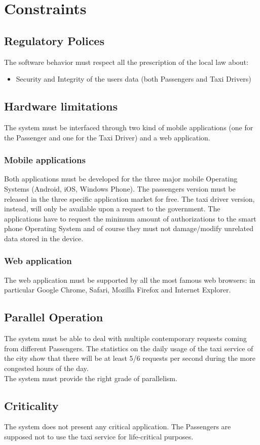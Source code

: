 \section{Constraints}
\subsection{Regulatory Polices}
The software behavior must respect all the prescription of the local law about:
\begin{itemize}
\item Security and Integrity of the users data (both Passengers and Taxi Drivers)
\end{itemize}
\subsection{Hardware limitations}
The system must be interfaced through two kind of mobile applications (one for the Passenger and one for the Taxi Driver) and a web application.
\subsubsection{Mobile applications}
Both applications must be developed for the three major mobile Operating Systems (Android, iOS, Windows Phone). The passengers version must be released in the three specific application market for free. The taxi driver version, instead, will only be available upon a request to the government. The applications have to request the minimum amount of authorizations to the smart phone Operating System and of course they must not damage/modify unrelated data stored in the device.
\subsubsection{Web application}
The web application must be supported by all the most famous web browsers: in particular Google Chrome, Safari, Mozilla Firefox and Internet Explorer.
\subsection{Parallel Operation}
The system must be able to deal with multiple contemporary requests coming from different Passengers. The statistics on the daily usage of the taxi service of the city show that there will be at least 5/6 requests per second during the more congested hours of the day.\\
The system must provide the right grade of parallelism.
\subsection{Criticality}
The system does not present any critical application. The Passengers are supposed not to use the taxi service for life-critical purposes.